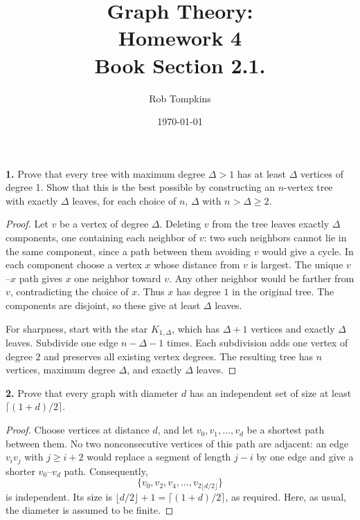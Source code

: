 \documentclass[12pt]{amsart}
\title{Graph Theory:\\Homework 4\\ Book Section 2.1.}
\author{Rob Tompkins}
\date{\today}
\theoremstyle{conjecture}
\theoremstyle{definition}
\theoremstyle{question}
\theoremstyle{theorem}
\begin{document}
    \maketitle
    \noindent\textbf{1.} Prove that every tree with maximum degree $\Delta > 1$ has at least $\Delta$
    vertices of degree 1.
    Show that this is the best possible by constructing an $n$-vertex tree with exactly $\Delta$ leaves,
    for each choice of $n$, $\Delta$ with $n > \Delta \ge 2$.


    \begin{proof}
        Let $v$ be a vertex of degree $\Delta$.  Deleting $v$ from the tree
        leaves exactly $\Delta$ components, one containing each neighbor of $v$:
        two such neighbors cannot lie in the same component, since a path
        between them avoiding $v$ would give a cycle.
        In each component choose a vertex $x$ whose distance from $v$ is largest.
        The unique $v$--$x$ path gives $x$ one neighbor toward $v$.
        Any other neighbor would be farther from $v$, contradicting the choice
        of $x$.  Thus $x$ has degree $1$ in the original tree.
        The components are disjoint, so these give at least $\Delta$ leaves.

        For sharpness, start with the star $K_{1,\Delta}$, which has
        $\Delta+1$ vertices and exactly $\Delta$ leaves.  Subdivide one edge
        $n-\Delta-1$ times.  Each subdivision adds one vertex of degree $2$
        and preserves all existing vertex degrees.  The resulting tree has
        $n$ vertices, maximum degree $\Delta$, and exactly $\Delta$ leaves.
    \end{proof}

    \noindent\textbf{2.} Prove that every graph with diameter $d$ has an independent set of size
    at least $\lceil (1 + d)/2 \rceil$.

    \begin{proof}
        Choose vertices at distance $d$, and let
        $v_0,v_1,\ldots,v_d$ be a shortest path between them.
        No two nonconsecutive vertices of this path are adjacent: an edge
        $v_iv_j$ with $j\ge i+2$ would replace a segment of length $j-i$
        by one edge and give a shorter $v_0$--$v_d$ path.
        Consequently,
        \[
            \{v_0,v_2,v_4,\ldots,v_{2\lfloor d/2\rfloor}\}
        \]
        is independent.  Its size is
        $\lfloor d/2\rfloor+1=\lceil(1+d)/2\rceil$, as required.
        Here, as usual, the diameter is assumed to be finite.
    \end{proof}
\end{document}

